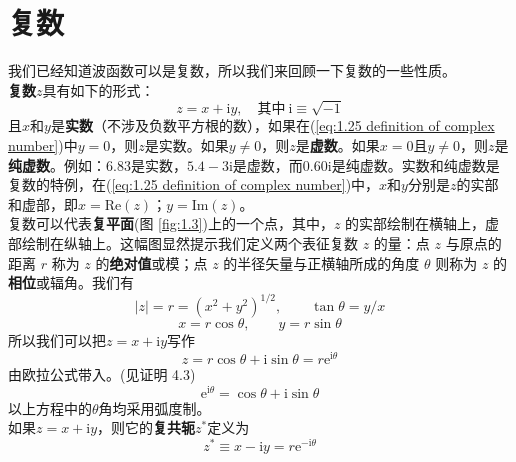 	\section{复数}
	我们已经知道波函数可以是复数，所以我们来回顾一下复数的一些性质。\\
	\indent \textbf{复数}$z$具有如下的形式：
	\begin{equation}
		z = x+\mathrm{i}y, \quad \text{其中} \: \mathrm{i}  \equiv \sqrt{-1}
		\label{eq:1.25 definition of complex number}
	\end{equation}
	且$x$和$y$是\textbf{实数}（不涉及负数平方根的数），如果在(\ref{eq:1.25 definition of complex number})中$y=0$，则$z$是实数。如果$y \neq 0$，则$z$是\textbf{虚数}。如果$x=0$且$y \neq 0$，则$z$是\textbf{纯虚数}。例如：6.83是实数，$5.4-3\mathrm{i}$是虚数，而$0.60\mathrm{i}$是纯虚数。实数和纯虚数是复数的特例，在(\ref{eq:1.25 definition of complex number})中，$x$和$y$分别是$z$的实部和虚部，即$x = \mathrm{Re} \left(z\right)$；$y = \mathrm{Im}\left(z\right)$。\\
	\indent 复数可以代表\textbf{复平面}(图 \ref{fig:1.3})上的一个点，其中，$z$ 的实部绘制在横轴上，虚部绘制在纵轴上。这幅图显然提示我们定义两个表征复数 $z$ 的量：点 $z$ 与原点的距离 $r$ 称为 $z$ 的\textbf{绝对值}或模；点 $z$ 的半径矢量与正横轴所成的角度 $\theta$ 则称为 $z$ 的\textbf{相位}或辐角。我们有
	\begin{equation}
		\left|z\right| = r = \left(x^2+y^2\right)^{1/2}, \qquad \tan \theta = y/x
		\label{eq:1.26 definition of phase and absolute value}
	\end{equation}
	\begin{equation*}
		x = r \cos \theta, \qquad y = r \sin \theta
	\end{equation*}
	所以我们可以把$z = x+ \mathrm{i}y$写作
	\begin{equation}
		z = r \cos \theta + \mathrm{i} \sin \theta = r \mathrm{e}^{\mathrm{i} \theta}
		\label{eq:1.27 Triangular forms of complex numbers}
	\end{equation}	
	由欧拉公式带入。(见证明 4.3)
	\begin{equation}
		\boxed{\mathrm{e}^{\mathrm{i}\theta} = \cos \theta + \mathrm{i} \sin\theta}
		\label{eq:1.28 Euler's equation}
	\end{equation}
	以上方程中的$\theta$角均采用弧度制。\\
	\indent 如果$z = x + \mathrm{i}y$，则它的\textbf{复共轭}$z^{\ast}$定义为
	\begin{equation}
		z^{\ast} \equiv x - \mathrm{i}y = r \mathrm{e} ^{-\mathrm{i}\theta}
		\label{eq:1.29 definition of complexconjugate}
	\end{equation}
